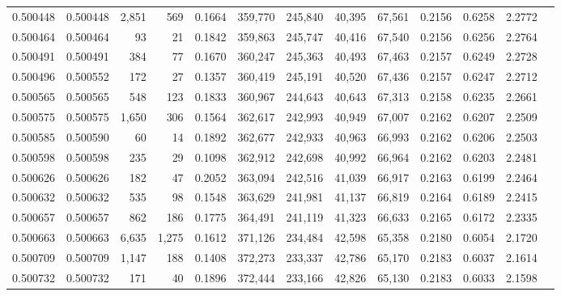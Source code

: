 \begin{tabular}{rrrrrrrrrrrrr}
0.500448 & 0.500448 & 2,851 &   569 &                                     0.1664 & 359,770 & 245,840 &  40,395 &  67,561 & 0.2156 & 0.6258 & 2.2772 \\
0.500464 & 0.500464 &    93 &    21 &                                     0.1842 & 359,863 & 245,747 &  40,416 &  67,540 & 0.2156 & 0.6256 & 2.2764 \\
0.500491 & 0.500491 &   384 &    77 &                                     0.1670 & 360,247 & 245,363 &  40,493 &  67,463 & 0.2157 & 0.6249 & 2.2728 \\
0.500496 & 0.500552 &   172 &    27 &                                     0.1357 & 360,419 & 245,191 &  40,520 &  67,436 & 0.2157 & 0.6247 & 2.2712 \\
0.500565 & 0.500565 &   548 &   123 &                                     0.1833 & 360,967 & 244,643 &  40,643 &  67,313 & 0.2158 & 0.6235 & 2.2661 \\
0.500575 & 0.500575 & 1,650 &   306 &                                     0.1564 & 362,617 & 242,993 &  40,949 &  67,007 & 0.2162 & 0.6207 & 2.2509 \\
0.500585 & 0.500590 &    60 &    14 &                                     0.1892 & 362,677 & 242,933 &  40,963 &  66,993 & 0.2162 & 0.6206 & 2.2503 \\
0.500598 & 0.500598 &   235 &    29 &                                     0.1098 & 362,912 & 242,698 &  40,992 &  66,964 & 0.2162 & 0.6203 & 2.2481 \\
0.500626 & 0.500626 &   182 &    47 &                                     0.2052 & 363,094 & 242,516 &  41,039 &  66,917 & 0.2163 & 0.6199 & 2.2464 \\
0.500632 & 0.500632 &   535 &    98 &                                     0.1548 & 363,629 & 241,981 &  41,137 &  66,819 & 0.2164 & 0.6189 & 2.2415 \\
0.500657 & 0.500657 &   862 &   186 &                                     0.1775 & 364,491 & 241,119 &  41,323 &  66,633 & 0.2165 & 0.6172 & 2.2335 \\
0.500663 & 0.500663 & 6,635 & 1,275 &                                     0.1612 & 371,126 & 234,484 &  42,598 &  65,358 & 0.2180 & 0.6054 & 2.1720 \\
0.500709 & 0.500709 & 1,147 &   188 &                                     0.1408 & 372,273 & 233,337 &  42,786 &  65,170 & 0.2183 & 0.6037 & 2.1614 \\
0.500732 & 0.500732 &   171 &    40 &                                     0.1896 & 372,444 & 233,166 &  42,826 &  65,130 & 0.2183 & 0.6033 & 2.1598 \\

\end{tabular}
